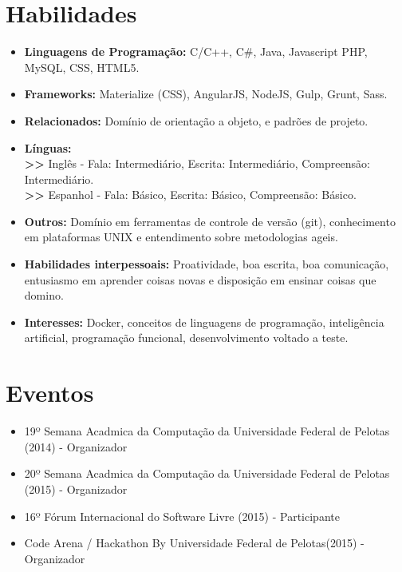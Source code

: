 \documentclass[11pt,a4paper,sans]{moderncv}        %
\begin{document}
\section{Habilidades}

\vspace{6pt}

\begin{itemize}

\item \textbf{Linguagens de Programação:} C/C++, C\#, Java, Javascript PHP, MySQL, CSS, HTML5.
\item \textbf{Frameworks:} Materialize (CSS), AngularJS, NodeJS, Gulp, Grunt, Sass.
\item \textbf{Relacionados:} Domínio de orientação a objeto, e padrões de projeto. 
\item \textbf{Línguas:}
\\\textbf{>>} Inglês - Fala: Intermediário, Escrita: Intermediário, Compreensão: Intermediário. 
\\\textbf{>>} Espanhol - Fala: Básico, Escrita: Básico, Compreensão: Básico.  
\item \textbf{Outros:} Domínio em ferramentas de controle de versão (git), conhecimento em plataformas UNIX e entendimento sobre metodologias ageis.
\item \textbf{Habilidades interpessoais:} Proatividade, boa escrita, boa comunicação, entusiasmo em aprender coisas novas e disposição em ensinar coisas que domino.
\item \textbf{Interesses:} Docker, conceitos de linguagens de programação, inteligência artificial, programação funcional, desenvolvimento voltado a teste. 

\end{itemize}


\section{Eventos}

\vspace{6pt}
 
\begin{itemize}

\item{19º Semana Acadmica da Computação da Universidade Federal de Pelotas (2014) - Organizador}
\item{20º Semana Acadmica da Computação da Universidade Federal de Pelotas (2015)  - Organizador}
\item{16º Fórum Internacional do Software Livre (2015) - Participante}
\item{Code Arena / Hackathon By Universidade Federal de Pelotas(2015) - Organizador}
\end{itemize}
\end{document}
